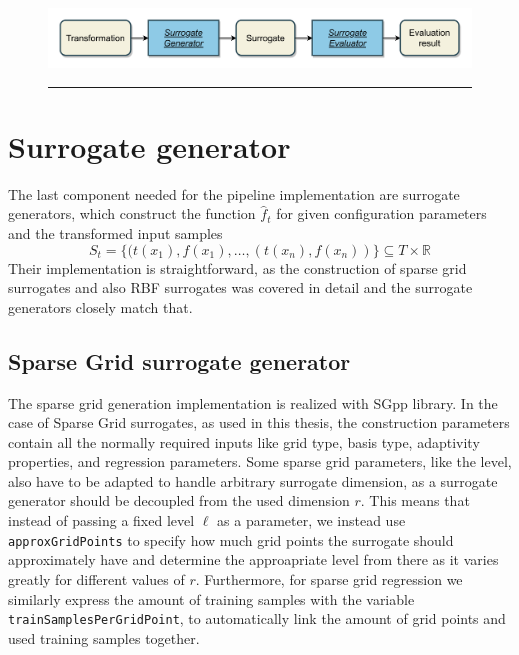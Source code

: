 \documentclass[
  a4paper,  %
  twoside,  %
  bibliography=totoc,
  headsepline,
  cleardoublepage=empty,
  parskip=half,
  draft=false
]{scrbook}
\newcommand{\delimit}{{\color{silver}\noindent\rule{\textwidth}{1pt}}}
\begin{document}
\newpage
\begin{mdframed}[style=style,frametitle={Transformation evaluator (forward looking)}]
\begin{figure}[H]
\includegraphics[width=\textwidth]{graphics/TransformationEval.pdf}
\delimit

\label{fig:te}
\end{figure}
\end{mdframed}

\section {Surrogate generator}
\label{sec:sg}

The last component needed for the pipeline implementation are surrogate generators, which construct the function $\hat{f}_t$ for given configuration parameters and the transformed input samples
\begin{equation}
S_t=\{(t(x_1), f(x_1), \dots, (t(x_n), f(x_n))\} \subseteq T \times \mathds{R}
\end{equation}
Their implementation is straightforward, as the construction of sparse grid surrogates and also RBF surrogates was covered in detail and the surrogate generators closely match that.


\subsection {Sparse Grid surrogate generator}

The sparse grid generation implementation is realized with SGpp \cite{} library.
In the case of Sparse Grid surrogates, as used in this thesis, the construction parameters contain all the normally required inputs like grid type, basis type, adaptivity properties, and regression parameters.
Some sparse grid parameters, like the level, also have to be adapted to handle arbitrary surrogate dimension, as a surrogate generator should be decoupled from the used dimension $r$. 
This means that instead of passing a fixed level $\ell$ as a parameter, we instead use \texttt{approxGridPoints} to specify how much grid points the surrogate should approximately have and determine the approapriate level from there as it varies greatly for different values of $r$.
Furthermore, for sparse grid regression we similarly express the amount of training samples with the variable \texttt{trainSamplesPerGridPoint}, to automatically link the amount of grid points and used training samples together.
\end{document}
